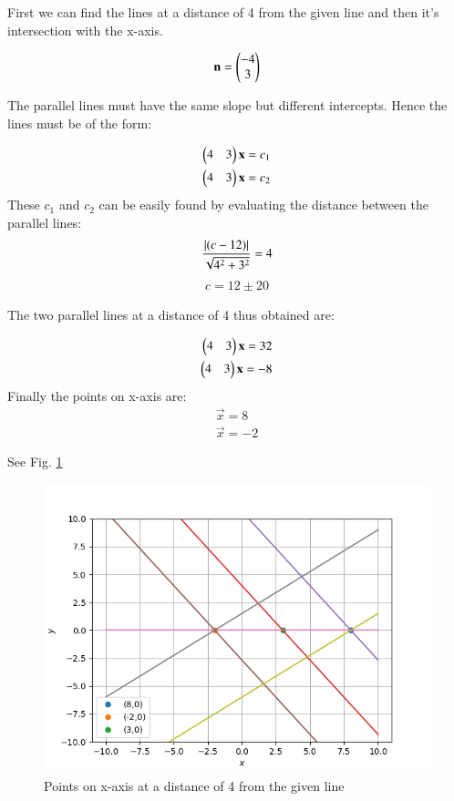 
First we can find the lines at a distance of 4 from the given line and then it's intersection with the x-axis.


\[\textbf{n}=\begin{pmatrix}-4 \\ 3\end{pmatrix}\]

The parallel lines must have the same slope but different intercepts. Hence the lines must be of the form:

\begin{align}
\begin{pmatrix}4 & 3\end{pmatrix} \mathbf{x} = {c_1} 
\\
\begin{pmatrix}4 & 3\end{pmatrix} \mathbf{x} = {c_2}
\end{align}
These $c_1$ and $c_2$ can be easily found by evaluating the distance between the parallel lines:
\begin{align}
\frac{\left\vert( c - 12 )\right\vert}{\sqrt{4^{2} + 3^{2}}} = 4
\end{align}
\begin{align}
c = 12 \pm 20
\end{align}


The two parallel lines at a distance of 4 thus obtained are:

\begin{align}
\begin{pmatrix}4 & 3\end{pmatrix}\mathbf{x} = 32
\\
\begin{pmatrix}4 & 3\end{pmatrix}\mathbf{x} = -8
\end{align}
Finally the points on x-axis are:
\begin{align}
\vec{x} = 8
\\
\vec{x} = -2
\end{align}

See Fig. \ref{fig1:solutions/line_plane/34/}


\begin{figure}[!ht]

\centering

\includegraphics[width=\columnwidth]{./solutions/line_plane/34/figs/Figure_1.png}

\caption{Points on x-axis at a distance of 4 from the given line}

\label{fig1:solutions/line_plane/34/}

\end{figure}
